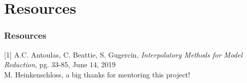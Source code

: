 \section{Resources}

\begin{frame}

\frametitle{Resources}

[1] A.C. Antoulas, C. Beattie, S. Gugercin, {\it{Interpolatory Methods for Model Reduction}}, pg. 33-85, June 14, 2019\\
\bigskip
[2] M. Heinkenschloss, a big thanks for mentoring this project!\\

\end{frame} 